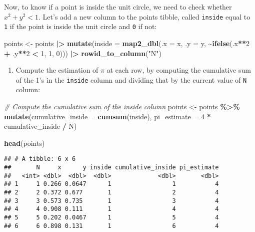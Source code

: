 \documentclass[
]{article}
\newenvironment{Shaded}{\begin{snugshade}}{\end{snugshade}}
\newcommand{\AttributeTok}[1]{\textcolor[rgb]{0.13,0.29,0.53}{#1}}
\newcommand{\CommentTok}[1]{\textcolor[rgb]{0.56,0.35,0.01}{\textit{#1}}}
\newcommand{\DecValTok}[1]{\textcolor[rgb]{0.00,0.00,0.81}{#1}}
\newcommand{\FunctionTok}[1]{\textcolor[rgb]{0.13,0.29,0.53}{\textbf{#1}}}
\newcommand{\NormalTok}[1]{#1}
\newcommand{\OtherTok}[1]{\textcolor[rgb]{0.56,0.35,0.01}{#1}}
\newcommand{\SpecialCharTok}[1]{\textcolor[rgb]{0.81,0.36,0.00}{\textbf{#1}}}
\newcommand{\StringTok}[1]{\textcolor[rgb]{0.31,0.60,0.02}{#1}}
\providecommand{\tightlist}{%
  \setlength{\itemsep}{0pt}\setlength{\parskip}{0pt}}
\begin{document}
Now, to know if a point is inside the unit circle, we need to check
whether \(x^2 + y^2 < 1\). Let's add a new column to the points tibble,
called \texttt{inside} equal to \texttt{1} if the point is inside the
unit circle and \texttt{0} if not:

\begin{Shaded}
\begin{Highlighting}[]
\NormalTok{points }\OtherTok{\textless{}{-}}\NormalTok{ points }\SpecialCharTok{|\textgreater{}} 
    \FunctionTok{mutate}\NormalTok{(}\AttributeTok{inside =} \FunctionTok{map2\_dbl}\NormalTok{(}\AttributeTok{.x =}\NormalTok{ x, }\AttributeTok{.y =}\NormalTok{ y, }\SpecialCharTok{\textasciitilde{}}\FunctionTok{ifelse}\NormalTok{(.x}\SpecialCharTok{**}\DecValTok{2} \SpecialCharTok{+}\NormalTok{ .y}\SpecialCharTok{**}\DecValTok{2} \SpecialCharTok{\textless{}} \DecValTok{1}\NormalTok{, }\DecValTok{1}\NormalTok{, }\DecValTok{0}\NormalTok{))) }\SpecialCharTok{|\textgreater{}} 
    \FunctionTok{rowid\_to\_column}\NormalTok{(}\StringTok{"N"}\NormalTok{)}
\end{Highlighting}
\end{Shaded}

\begin{enumerate}
\def\labelenumi{\alph{enumi}.}
\tightlist
\item
  Compute the estimation of \(\pi\) at each row, by computing the
  cumulative sum of the 1's in the \texttt{inside} column and dividing
  that by the current value of \texttt{N} column:
\end{enumerate}

\begin{Shaded}
\begin{Highlighting}[]
\CommentTok{\# Compute the cumulative sum of the \textasciigrave{}inside\textasciigrave{} column}
\NormalTok{points }\OtherTok{\textless{}{-}}\NormalTok{ points }\SpecialCharTok{\%\textgreater{}\%}
  \FunctionTok{mutate}\NormalTok{(}\AttributeTok{cumulative\_inside =} \FunctionTok{cumsum}\NormalTok{(inside),}
         \AttributeTok{pi\_estimate =} \DecValTok{4} \SpecialCharTok{*}\NormalTok{ cumulative\_inside }\SpecialCharTok{/}\NormalTok{ N)}

\FunctionTok{head}\NormalTok{(points)}
\end{Highlighting}
\end{Shaded}

\begin{verbatim}
## # A tibble: 6 x 6
##       N     x      y inside cumulative_inside pi_estimate
##   <int> <dbl>  <dbl>  <dbl>             <dbl>       <dbl>
## 1     1 0.266 0.0647      1                 1           4
## 2     2 0.372 0.677       1                 2           4
## 3     3 0.573 0.735       1                 3           4
## 4     4 0.908 0.111       1                 4           4
## 5     5 0.202 0.0467      1                 5           4
## 6     6 0.898 0.131       1                 6           4
\end{verbatim}
\end{document}
